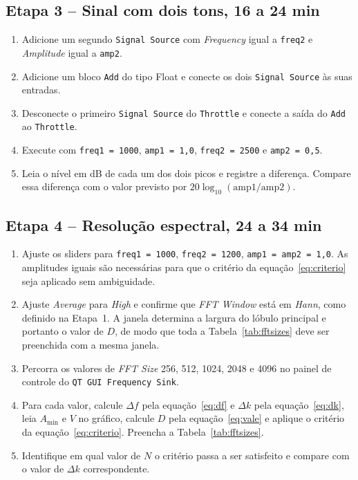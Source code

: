 \documentclass[11pt,a4paper]{article}
\begin{document}
\subsection*{Etapa 3 -- Sinal com dois tons, 16 a 24 min}

\begin{instrucao}
\begin{enumerate}[label=\arabic*.]
  \item Adicione um segundo \texttt{Signal Source} com \textit{Frequency}
    igual a \texttt{freq2} e \textit{Amplitude} igual a \texttt{amp2}.
  \item Adicione um bloco \texttt{Add} do tipo Float e conecte os dois
    \texttt{Signal Source} às suas entradas.
  \item Desconecte o primeiro \texttt{Signal Source} do \texttt{Throttle} e
    conecte a saída do \texttt{Add} ao \texttt{Throttle}.
  \item Execute com \texttt{freq1 = 1000}, \texttt{amp1 = 1{,}0},
    \texttt{freq2 = 2500} e \texttt{amp2 = 0{,}5}.
  \item Leia o nível em dB de cada um dos dois picos e registre a diferença.
    Compare essa diferença com o valor previsto por
    $20\log_{10}(\mathrm{amp1}/\mathrm{amp2})$.
\end{enumerate}
\end{instrucao}

\subsection*{Etapa 4 -- Resolução espectral, 24 a 34 min}

\begin{instrucao}
\begin{enumerate}[label=\arabic*.]
  \item Ajuste os sliders para \texttt{freq1 = 1000}, \texttt{freq2 = 1200},
    \texttt{amp1 = amp2 = 1{,}0}. As amplitudes iguais são necessárias para
    que o critério da equação~\eqref{eq:criterio} seja aplicado sem
    ambiguidade.
  \item Ajuste \textit{Average} para \textit{High} e confirme que
    \textit{FFT Window} está em \textit{Hann}, como definido na Etapa~1. A
    janela determina a largura do lóbulo principal e portanto o valor de
    $D$, de modo que toda a Tabela~\ref{tab:fftsizes} deve ser preenchida
    com a mesma janela.
  \item Percorra os valores de \textit{FFT Size} 256, 512, 1024, 2048 e 4096
    no painel de controle do \texttt{QT GUI Frequency Sink}.
  \item Para cada valor, calcule $\Delta f$ pela equação~\eqref{eq:df} e
    $\Delta k$ pela equação~\eqref{eq:dk}, leia $A_{\min}$ e $V$ no gráfico,
    calcule $D$ pela equação~\eqref{eq:vale} e aplique o critério da
    equação~\eqref{eq:criterio}. Preencha a Tabela~\ref{tab:fftsizes}.
  \item Identifique em qual valor de $N$ o critério passa a ser satisfeito e
    compare com o valor de $\Delta k$ correspondente.
\end{enumerate}
\end{instrucao}
\end{document}
